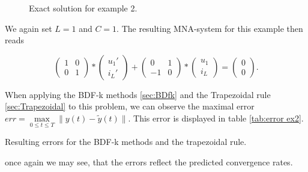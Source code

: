 \begin{example2}
\begin{figure}[H]
\begin{minipage}{.5\textwidth}
			\caption{Exact solution for example 2.}
			\label{fig: Exact solution for example 2}
		\end{minipage}
	\end{figure}
	
	We again set $L=1$ and $C=1$. The resulting MNA-system for this example then reads
	
	\begin{displaymath}
		\begin{pmatrix}
			1 & 0 \\
			0 & 1 
		\end{pmatrix}
		*
		\begin{pmatrix}
			u_1' \\
			i_L'
		\end{pmatrix}
		+
		\begin{pmatrix}
			0 & 1 \\
			-1 & 0
		\end{pmatrix}
		*
		\begin{pmatrix}
			u_1 \\
			i_L
		\end{pmatrix}
		=
		\begin{pmatrix}
			0 \\
			0 
		\end{pmatrix}.
	\end{displaymath}
	
	When applying the BDF-k methods \ref{sec:BDfk} and the Trapezoidal rule \ref{sec:Trapezoidal} to this problem, we can observe the maximal error $err = \max\limits_{0 \leq t \leq T} \| y(t) - \tilde{y}(t) \|$. This error is displayed in table \ref{tab:error ex2}.
		
	\begin{table}[H]
		\caption{Resulting errors for the BDF-k methods and the trapezoidal rule.}
		\label{tab:error ex2}
	\end{table}

	once again we may see, that the errors reflect the predicted convergence rates.
\end{example2}
	


